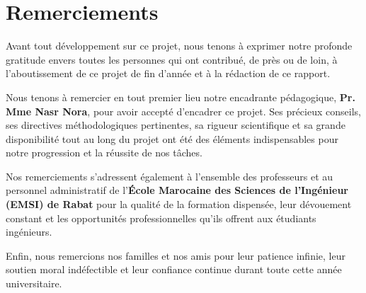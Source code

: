 \chapter*{Remerciements}

Avant tout développement sur ce projet, nous tenons à exprimer notre profonde gratitude envers toutes les personnes qui ont contribué, de près ou de loin, à l'aboutissement de ce projet de fin d'année et à la rédaction de ce rapport.

\vspace{0.5cm}

Nous tenons à remercier en tout premier lieu notre encadrante pédagogique, \textbf{Pr. Mme Nasr Nora}, pour avoir accepté d'encadrer ce projet. Ses précieux conseils, ses directives méthodologiques pertinentes, sa rigueur scientifique et sa grande disponibilité tout au long du projet ont été des éléments indispensables pour notre progression et la réussite de nos tâches.

\vspace{0.5cm}

Nos remerciements s'adressent également à l'ensemble des professeurs et au personnel administratif de l'\textbf{École Marocaine des Sciences de l'Ingénieur (EMSI) de Rabat} pour la qualité de la formation dispensée, leur dévouement constant et les opportunités professionnelles qu'ils offrent aux étudiants ingénieurs.

\vspace{0.5cm}

Enfin, nous remercions nos familles et nos amis pour leur patience infinie, leur soutien moral indéfectible et leur confiance continue durant toute cette année universitaire.
\newpage
